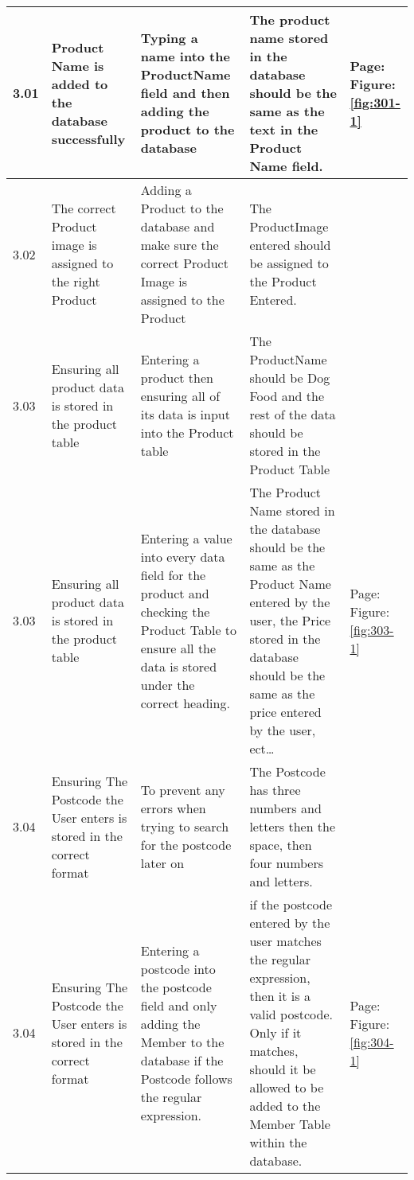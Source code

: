 \begin{flushleft}
\begin{longtable}{|p{1cm}|p{2.5cm}|p{2.5cm}|p{2cm}|p{2cm}|}
	\rowcolor{light-grey}3.01 & Product Name is added to the database successfully & Typing a name into the ProductName field and then adding the product to the database & The product name stored in the database should be the same as the text in the Product Name field.& Page:\pageref{fig:301-1}  \newline Figure:\ref{fig:301-1} \newline \newline  \\ \hline
	3.02 & The correct Product image is assigned to the right Product & Adding a Product to the database and make sure the correct Product Image is assigned to the Product & The ProductImage entered should be assigned to the Product Entered. & \\ \hline
	\rowcolor{dark-grey}3.03 & Ensuring all product data is stored in the product table & Entering a product then ensuring all of its data is input into the Product table  & The ProductName should be Dog Food and the rest of the data should be stored in the Product Table & \\ \hline
	\rowcolor{light-grey}3.03 & Ensuring all product data is stored in the product table & Entering a value into every data field for the product and checking the Product Table to ensure all the data is stored under the correct heading.  & The Product Name stored in the database should be the same as the Product Name entered by the user, the Price stored in the database should be the same as the price entered by the user, ect\ldots &  Page:\pageref{fig:303-1}  \newline Figure:\ref{fig:303-1} \\ \hline
	\rowcolor{dark-grey}3.04 & Ensuring The Postcode the User enters is stored in the correct format  & To prevent any errors when trying to search for the postcode later on  & The Postcode has three numbers and letters then the space, then four numbers and letters. & \\ \hline
	\rowcolor{light-grey}3.04 & Ensuring The Postcode the User enters is stored in the correct format  & Entering a postcode into the postcode field and only adding the Member to the database if the Postcode follows the regular expression. &if the postcode entered by the user matches the regular expression, then it is a valid postcode. Only if it matches, should it be allowed to be added to the Member Table within the database.&  Page:\pageref{fig:304-1}  \newline Figure:\ref{fig:304-1} \\ \hline

\end{longtable}
\end{flushleft}
